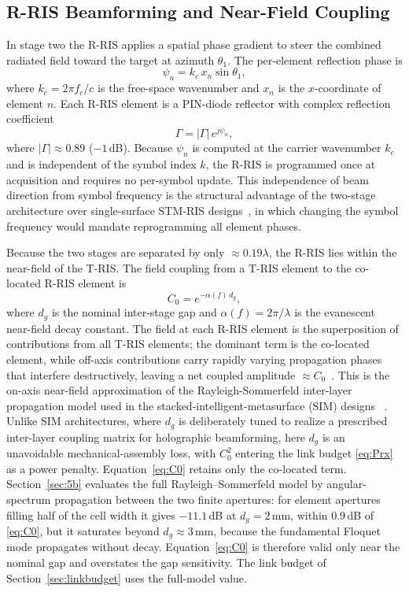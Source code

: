 \documentclass[journal]{IEEEtran}
\newcommand{\Tris}{T-RIS}
\newcommand{\Rris}{R-RIS}
\begin{document}
\subsection{R-RIS Beamforming and Near-Field Coupling}
In stage two the \Rris{} applies a spatial phase gradient to steer the
combined radiated field toward the target at azimuth $\theta_1$. The
per-element reflection phase is
\begin{equation}
\psi_n = k_c\, x_n \sin\theta_1,
\label{eq:psi}
\end{equation}
where $k_c = 2\pi f_c / c$ is the free-space wavenumber and $x_n$ is the
$x$-coordinate of element $n$. Each \Rris{} element is a PIN-diode reflector
with complex reflection coefficient~\cite{dai2020reconfigurable}
\begin{equation}
\Gamma = |\Gamma|\,e^{j\psi_n},
\label{eq:Gamma}
\end{equation}
where $|\Gamma| \approx 0.89$ ($-1$\,dB). Because $\psi_n$ is computed at the
carrier wavenumber $k_c$ and is independent of the symbol index $k$, the
\Rris{} is programmed once at acquisition and requires no per-symbol update.
This independence of beam direction from symbol frequency is the structural
advantage of the two-stage architecture over single-surface STM-RIS
designs~\cite{zhang2018space}, in which changing the symbol frequency
would mandate reprogramming all element phases.

Because the two stages are separated by only $\approx 0.19\lambda$, the
\Rris{} lies within the near-field of the \Tris. The field coupling from a
\Tris{} element to the co-located \Rris{} element is~\cite{marcuvitz1951waveguide,pfeiffer2013cascaded}
\begin{equation}
C_0 = e^{-\alpha(f)\, d_g},
\label{eq:C0}
\end{equation}
where $d_g$ is the nominal inter-stage gap and $\alpha(f) = 2\pi/\lambda$ is
the evanescent near-field decay constant. The field at each \Rris{} element
is the superposition of contributions from all \Tris{} elements; the
dominant term is the co-located element, while off-axis contributions carry
rapidly varying propagation phases that interfere destructively, leaving a
net coupled amplitude $\approx C_0$~\cite{monticone2017metamaterial}. This is the
on-axis near-field approximation of the Rayleigh-Sommerfeld inter-layer
propagation model used in the stacked-intelligent-metasurface (SIM)
designs ~\cite{an2025stacked}. Unlike SIM architectures, where $d_g$ is
deliberately tuned to realize a prescribed inter-layer coupling matrix for
holographic beamforming, here $d_g$ is an unavoidable mechanical-assembly loss, with $C_0^2$ entering the link budget \eqref{eq:Prx} as a power penalty. Equation~\eqref{eq:C0} retains only the co-located term. Section~\ref{sec:5b} evaluates the full Rayleigh--Sommerfeld model by angular-spectrum propagation between the two finite apertures: for element apertures filling half of the cell width it gives $-11.1$\,dB at $d_g = 2$\,mm, within 0.9\,dB of \eqref{eq:C0}, but it saturates beyond $d_g \approx 3$\,mm, because the fundamental Floquet mode propagates without decay. Equation~\eqref{eq:C0} is therefore valid only near the nominal gap and overstates the gap sensitivity. The link budget of Section~\ref{sec:linkbudget} uses the full-model value.
\end{document}
